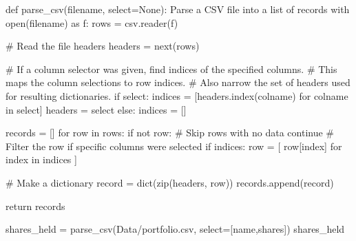 \documentclass[
  letterpaper,
  DIV=11,
  numbers=noendperiod]{scrreprt}
\newenvironment{Shaded}{\begin{snugshade}}{\end{snugshade}}
\newcommand{\BuiltInTok}[1]{\textcolor[rgb]{0.00,0.46,0.62}{#1}}
\newcommand{\CommentTok}[1]{\textcolor[rgb]{0.37,0.37,0.37}{#1}}
\newcommand{\ControlFlowTok}[1]{\textcolor[rgb]{0.00,0.46,0.62}{#1}}
\newcommand{\ImportTok}[1]{\textcolor[rgb]{0.00,0.46,0.62}{#1}}
\newcommand{\KeywordTok}[1]{\textcolor[rgb]{0.00,0.46,0.62}{#1}}
\newcommand{\NormalTok}[1]{\textcolor[rgb]{0.00,0.46,0.62}{#1}}
\newcommand{\OperatorTok}[1]{\textcolor[rgb]{0.37,0.37,0.37}{#1}}
\newcommand{\StringTok}[1]{\textcolor[rgb]{0.13,0.47,0.30}{#1}}
\newcommand{\VariableTok}[1]{\textcolor[rgb]{0.07,0.07,0.07}{#1}}
\begin{document}
\begin{Shaded}
\begin{Highlighting}[]
\KeywordTok{def}\NormalTok{ parse\_csv(filename, select}\OperatorTok{=}\VariableTok{None}\NormalTok{):}
    \CommentTok{\textquotesingle{}\textquotesingle{}\textquotesingle{}}
\CommentTok{    Parse a CSV file into a list of records}
\CommentTok{    \textquotesingle{}\textquotesingle{}\textquotesingle{}}
    \ControlFlowTok{with} \BuiltInTok{open}\NormalTok{(filename) }\ImportTok{as}\NormalTok{ f:}
\NormalTok{        rows }\OperatorTok{=}\NormalTok{ csv.reader(f)}

        \CommentTok{\# Read the file headers}
\NormalTok{        headers }\OperatorTok{=} \BuiltInTok{next}\NormalTok{(rows)}

        \CommentTok{\# If a column selector was given, find indices of the specified columns.}
        \CommentTok{\# This maps the column selections to row indices.}
        \CommentTok{\# Also narrow the set of headers used for resulting dictionaries.}
        \ControlFlowTok{if}\NormalTok{ select:}
\NormalTok{            indices }\OperatorTok{=}\NormalTok{ [headers.index(colname) }\ControlFlowTok{for}\NormalTok{ colname }\KeywordTok{in}\NormalTok{ select]}
\NormalTok{            headers }\OperatorTok{=}\NormalTok{ select}
        \ControlFlowTok{else}\NormalTok{:}
\NormalTok{            indices }\OperatorTok{=}\NormalTok{ []}

\NormalTok{        records }\OperatorTok{=}\NormalTok{ []}
        \ControlFlowTok{for}\NormalTok{ row }\KeywordTok{in}\NormalTok{ rows:}
            \ControlFlowTok{if} \KeywordTok{not}\NormalTok{ row:    }\CommentTok{\# Skip rows with no data}
                \ControlFlowTok{continue}
            \CommentTok{\# Filter the row if specific columns were selected}
            \ControlFlowTok{if}\NormalTok{ indices:}
\NormalTok{                row }\OperatorTok{=}\NormalTok{ [ row[index] }\ControlFlowTok{for}\NormalTok{ index }\KeywordTok{in}\NormalTok{ indices ]}

            \CommentTok{\# Make a dictionary}
\NormalTok{            record }\OperatorTok{=} \BuiltInTok{dict}\NormalTok{(}\BuiltInTok{zip}\NormalTok{(headers, row))}
\NormalTok{            records.append(record)}

    \ControlFlowTok{return}\NormalTok{ records}
\end{Highlighting}
\end{Shaded}

\begin{Shaded}
\begin{Highlighting}[]
\NormalTok{shares\_held }\OperatorTok{=}\NormalTok{ parse\_csv(}\StringTok{\textquotesingle{}Data/portfolio.csv\textquotesingle{}}\NormalTok{, select}\OperatorTok{=}\NormalTok{[}\StringTok{\textquotesingle{}name\textquotesingle{}}\NormalTok{,}\StringTok{\textquotesingle{}shares\textquotesingle{}}\NormalTok{])}
\NormalTok{shares\_held}
\end{Highlighting}
\end{Shaded}
\end{document}
